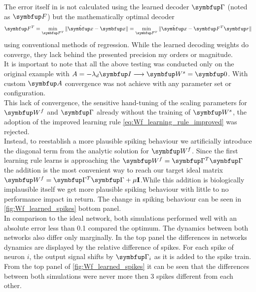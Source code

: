 The error itself in \cite{brendel_learning_2020} is not calculated using the learned decoder $\bmu{\Gamma}$ (noted as $\bmu{F}$) but the mathematically optimal decoder
\begin{equation}
\bmu{F}^T = \min_{\bmu{F}^T} \|\hat{\bmu{x}} - \bmu{x}\| = \min_{\bmu{F}^T} \|\hat{\bmu{x}} - \bmu{F}^T\bmu{r}\|
\end{equation}
using conventional methods of regression. While the learned decoding weights do converge, they lack behind the presented precision my orders or magnitude.\\
It is important to note that all the above testing was conducted only on the original example with $A = -\lambda_d\bmu{I} \longrightarrow \bmu{W}^s = \bmu{0}$. With custom $\bmu{A}$ convergence was not achieve with any parameter set or configuration.\\
This lack of convergence, the sensitive hand-tuning of the scaling parameters for $\bmu{W}^f$ and $\bmu{\Gamma}$ already without the training of $\bmu{W}^s$, the adoption of the improved learning rule \cref{eq:Wf_learning_rule_improved} was rejected.\\
Instead, to reestablish a more plausible spiking behaviour we
artificially introduce the diagonal term from the analytic solution for $\bmu{W}^f$. Since the first learning rule learns is approaching the $\bmu{W}^f = \bmu{\Gamma}^T\bmu{\Gamma}$ the addition is the most convenient way to reach our target ideal matrix $\bmu{W}^f = \bmu{\Gamma}^T\bmu{\Gamma} + \mu\mathbf{I}$.While this addition is biologically implausible itself we get more plausible spiking behaviour with little to no performance impact in return. The change in spiking behaviour can be seen in \cref{fig:Wf_learned_spikes} bottom panel.\\
 In comparison to the ideal network, both simulations performed well with an absolute error less than 0.1 compared the optimum. The dynamics between both networks also differ only marginally. In the top panel the differences in networks dynamics are displayed by the relative difference of spikes. For each spike of neuron $i$, the output signal shifts by $\bmu{\Gamma}_i$ as it is added to the spike train. From the top panel of \cref{fig:Wf_learned_spikes} it can be seen that the differences between both simulations were never more then 3 spikes different from each other.


